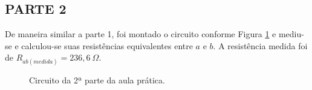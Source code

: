\documentclass[12pt]{article}
\begin{document}
    \subsection{PARTE 2}
    De maneira similar a parte 1, foi montado o circuito conforme Figura \ref{fig:circuito-parte2} e mediu-se e calculou-se suas resistências equivalentes entre $a$ e $b$. A resistência medida foi de $R_{ab(medida)}=236,6\ \Omega$.
    \begin{figure}[H]
        \centering
        \caption{Circuito da 2ª parte da aula prática.}
        \label{fig:circuito-parte2}
    \end{figure}
\end{document}
